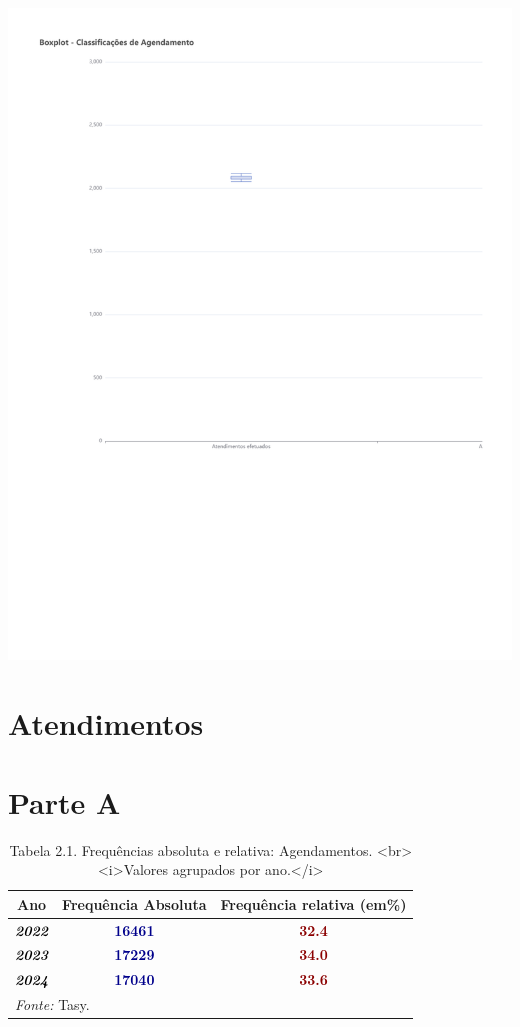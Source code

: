\documentclass[
  letterpaper,
  DIV=11,
  numbers=noendperiod]{scrreprt}
\begin{document}
\includegraphics{intro_files/figure-pdf/unnamed-chunk-5-1.pdf}

\hypertarget{atendimentos-1}{%
\section*{Atendimentos}\label{atendimentos-1}}


\section{Parte A}

\begin{table}
\centering
\caption{Tabela 2.1. Frequências absoluta e relativa: Agendamentos. <br><i>Valores agrupados por ano.</i>}
\centering
\begin{tabular}[t]{>{}c|>{}c|>{}c}
\hline
Ano & Frequência Absoluta & Frequência relativa (em\%)\\
\hline
\textcolor{black}{\em{\textbf{2022}}} & \textcolor{darkblue}{\textbf{16461}} & \textcolor{darkred}{\textbf{32.4}}\\
\hline
\textcolor{black}{\em{\textbf{2023}}} & \textcolor{darkblue}{\textbf{17229}} & \textcolor{darkred}{\textbf{34.0}}\\
\hline
\textcolor{black}{\em{\textbf{2024}}} & \textcolor{darkblue}{\textbf{17040}} & \textcolor{darkred}{\textbf{33.6}}\\
\hline
\multicolumn{3}{l}{\rule{0pt}{1em}\textit{Fonte: } Tasy.}\\
\end{tabular}
\end{table}
\end{document}
